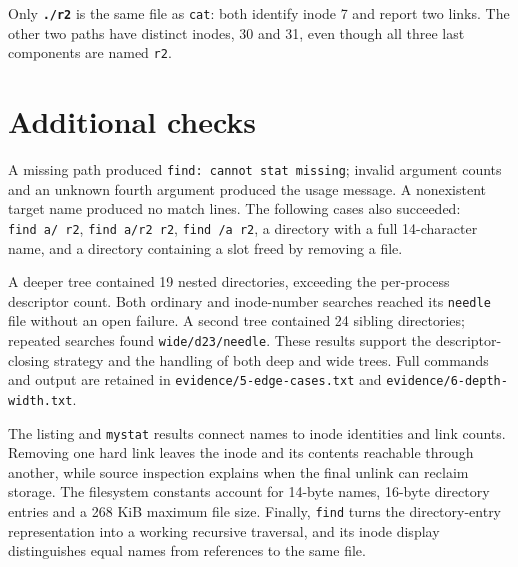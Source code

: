 \documentclass{../latex/utmreport}
\begin{document}
Only \textbf{\texttt{./r2}} is the same file as \texttt{cat}: both
identify inode 7 and report two links. The other two paths have distinct
inodes, 30 and 31, even though all three last components are named
\texttt{r2}.

\section{Additional checks}\label{additional-checks}

A missing path produced \texttt{find:\ cannot\ stat\ missing}; invalid
argument counts and an unknown fourth argument produced the usage
message. A nonexistent target name produced no match lines. The
following cases also succeeded: \texttt{find\ a/\ r2},
\texttt{find\ a/r2\ r2}, \texttt{find\ /a\ r2}, a directory with a full
14-character name, and a directory containing a slot freed by removing a
file.

A deeper tree contained 19 nested directories, exceeding the per-process
descriptor count. Both ordinary and inode-number searches reached its
\texttt{needle} file without an open failure. A second tree contained 24
sibling directories; repeated searches found \texttt{wide/d23/needle}.
These results support the descriptor-closing strategy and the handling
of both deep and wide trees. Full commands and output are retained in
\texttt{evidence/5-edge-cases.txt} and
\texttt{evidence/6-depth-width.txt}.

\utmconclusions

The listing and \texttt{mystat} results connect names to inode
identities and link counts. Removing one hard link leaves the inode and
its contents reachable through another, while source inspection explains
when the final unlink can reclaim storage. The filesystem constants
account for 14-byte names, 16-byte directory entries and a 268 KiB
maximum file size. Finally, \texttt{find} turns the directory-entry
representation into a working recursive traversal, and its inode display
distinguishes equal names from references to the same file.
\end{document}
